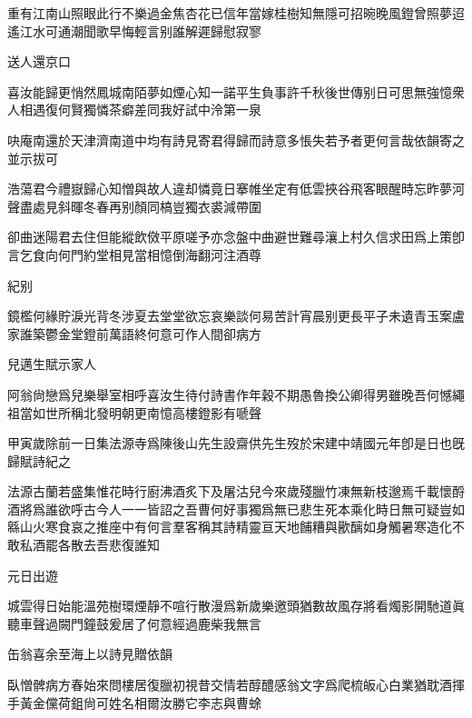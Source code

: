 \documentclass{zhvt-classic-Miya}
\begin{document}
重有江南山照眼此行不樂過金焦杏花已信年當嫁桂樹知無隱可招晼晚風鐙曾照夢迢遙江水可通潮聞歌早悔輕言别誰解遲歸慰寂寥

\begin{fw}送人還京口\end{fw}

喜汝能歸更悄然鳳城南陌夢如煙心知一諾平生負事許千秋後世傳别日可思無強憶衆人相遇復何賢獨憐茶癖差同我好試中泠第一泉

\begin{fw}吷庵南還於天津濟南道中均有詩見寄君得歸而詩意多悵失若予者更何言哉依韻寄之並示拔可\end{fw}

浩蕩君今禮嶽歸心知憎與故人違却憐竟日搴帷坐定有低雲挾谷飛客眼醒時忘昨夢河聲盡處見斜暉冬春再别顏同槁豈獨衣裘減帶圍

卻曲迷陽君去住但能縱飲傚平原嗟予亦念盤中曲避世難尋瀼上村久信求田爲上策卽言乞食向何門約堂相見當相憶倒海翻河注酒尊

\begin{fw}紀别\end{fw}

鏡檻何緣貯淚光背冬涉夏去堂堂欲忘哀樂談何易苦計宵晨别更長平子未遺青玉案盧家誰築鬱金堂鐙前萬語終何意可作人間卻病方

\begin{fw}兒邁生賦示家人\end{fw}

阿翁尙戀爲兒樂舉室相呼喜汝生待付詩書作年穀不期愚魯換公卿得男雖晚吾何憾繩祖當如世所稱北發明朝更南憶高樓鐙影有嗁聲

\begin{fw}甲寅歲除前一日集法源寺爲陳後山先生設齋供先生歿於宋建中靖國元年卽是日也旣歸賦詩紀之\end{fw}

法源古蘭若盛集惟花時行廚沸酒炙下及屠沽兒今來歲殘臘竹凍無新枝邈焉千載懷酹酒將爲誰欲呼古今人一一皆詔之吾曹何好事獨爲無已悲生死本乘化時日無可疑豈如緜山火寒食哀之推座中有何言羣客稱其詩精靈亘天地餔糟與歠醨如身觸暑寒造化不敢私酒罷各散去吾悲復誰知

\begin{fw}元日出遊\end{fw}

城雲得日始能溫苑樹環煙靜不喧行散漫爲新歲樂邀頭猶數故風存將看燭影開馳道眞聽車聲過闕門鐘鼓爰居了何意經過鹿柴我無言

\begin{fw}缶翁喜余至海上以詩見贈依韻\end{fw}

臥憎髀病方春始來問樓居復臘初視昔交情若醇醴感翁文字爲爬梳皈心白業猶耽酒揮手黃金儻荷鉏尙可姓名相爾汝勝它李志與曹蜍
\end{document}
